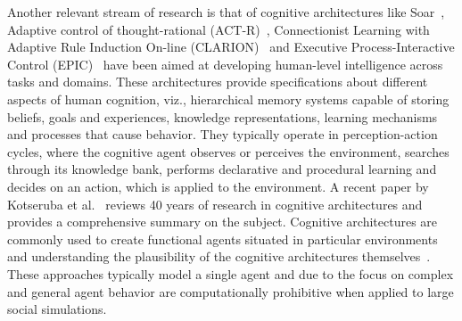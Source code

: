 \documentclass[doublespace]{VTthesis}
\begin{document}
    Another relevant stream of research is that of cognitive architectures like Soar~\cite{laird1987soar}, Adaptive control of thought-rational (ACT-R)~\cite{anderson2004integrated}, Connectionist Learning with Adaptive Rule Induction On-line (CLARION)~\cite{sun2006clarion} and Executive Process-Interactive Control (EPIC)~\cite{kieras1997overview} have been aimed at developing human-level intelligence across tasks and domains. These architectures provide specifications about different aspects of human cognition, viz., hierarchical memory systems capable of storing beliefs, goals and experiences, knowledge representations, learning mechanisms and processes that cause behavior. They typically operate in perception-action cycles, where the cognitive agent observes or perceives the environment, searches through its knowledge bank, performs declarative and procedural learning and decides on an action, which is applied to the environment. A recent paper by Kotseruba et al.~\cite{kotseruba2016review} reviews 40 years of research in cognitive architectures and provides a comprehensive summary on the subject. Cognitive architectures are commonly used to create functional agents situated in particular environments and understanding the plausibility of the cognitive architectures themselves~\cite{laird2000creating,laird1998integrating,fleetwood2002modeling,rubinoff1994real,borst2015using,byrne2001act}. These approaches typically model a single agent and due to the focus on complex and general agent behavior are computationally prohibitive when applied to large social simulations.
\end{document}
